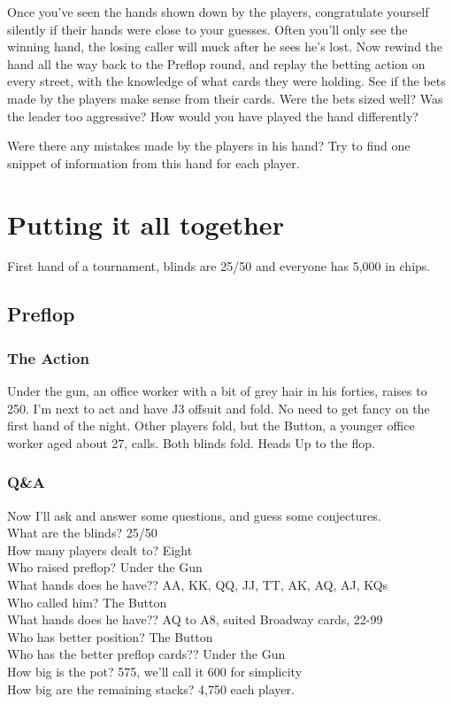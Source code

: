 Once you've seen the hands shown down by the players, congratulate yourself
silently if their hands were close to your guesses. Often you'll only
see the winning hand, the losing caller will muck after he sees
he's lost. Now rewind the hand all the way back to the Preflop round,
and replay the betting action on every street, with the knowledge of
what cards they were holding. See if the bets made by the players make
sense from their cards. Were the bets sized well? Was the leader too
aggressive? How would you have played the hand differently?

Were there any mistakes made by the players in his hand? Try to find
one snippet of information from this hand for each player.

\section{Putting it all together}

First hand of a tournament, blinds are 25/50 and everyone has 5,000 in chips.

\subsection*{Preflop}

\subsubsection*{The Action}
Under the gun, an office worker with a bit of grey hair in his forties,
raises to 250. I'm next to act and have J3 offsuit and fold.
No need to get fancy on the first hand of the night. Other players fold,
but the Button, a younger office worker aged about 27, calls. Both blinds fold.
Heads Up to the flop.

\subsubsection*{Q\&A}
Now I'll ask and answer some questions, and guess some conjectures. \\
What are the blinds? 25/50 \\
How many players dealt to? Eight \\
Who raised preflop? Under the Gun \\
What hands does he have?? AA, KK, QQ, JJ, TT, AK, AQ, AJ, KQs \\
Who called him? The Button \\
What hands does he have?? AQ to A8, suited Broadway cards, 22-99 \\
Who has better position? The Button \\
Who has the better preflop cards?? Under the Gun \\
How big is the pot? 575, we'll call it 600 for simplicity \\
How big are the remaining stacks? 4,750 each player.

